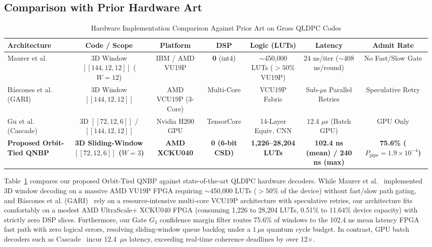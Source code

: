 \documentclass[journal]{IEEEtran}
\begin{document}
\subsection{Comparison with Prior Hardware Art}
\begin{table}[t]
\caption{Hardware Implementation Comparison Against Prior Art on Gross QLDPC Codes}
\label{tab:prior_art}
\centering
\begin{tabular}{lcccccc}
\toprule
\textbf{Architecture} & \textbf{Code / Scope} & \textbf{Platform} & \textbf{DSP} & \textbf{Logic (LUTs)} & \textbf{Latency} & \textbf{Admit Rate} \\
\midrule
Maurer et al.~\cite{maurer2025fpga} & 3D Window $[[144,12,12]]$ ($W=12$) & IBM / AMD VU19P & \textbf{0} (int4) & $\sim$450,000 LUTs ($>50\%$ VU19P) & 24 ns/iter ($\sim$408 ns/round) & No Fast/Slow Gate \\
B{\'a}scones et al. (GARI)~\cite{cowtan2024modular} & 3D Window $[[144,12,12]]$ & AMD VCU19P (3-Core) & Multi-Core & VCU19P Fabric & Sub-$\mu$s Parallel Retries & Speculative Retry \\
Gu et al. (Cascade)~\cite{gu2026cascade} & 3D $[[72,12,6]]$ / $[[144,12,12]]$ & Nvidia H200 GPU & TensorCore & 14-Layer Equiv. CNN & 12.4 $\mu$s (Batch GPU) & GPU Only \\
\midrule
\textbf{Proposed Orbit-Tied QNBP} & \textbf{3D Sliding-Window $[[72,12,6]]$ ($W=3$)} & \textbf{AMD XCKU040} & \textbf{0 (6-bit CSD)} & \textbf{1,226--28,204 LUTs} & \textbf{102.4 ns (mean) / 240 ns (max)} & \textbf{75.6\% ($P_{\text{pipe}} = 1.9\times 10^{-4}$)} \\
\bottomrule
\end{tabular}
\end{table}

Table~\ref{tab:prior_art} compares our proposed Orbit-Tied QNBP against state-of-the-art QLDPC hardware decoders. While Maurer et al.~\cite{maurer2025fpga} implemented 3D window decoding on a massive AMD VU19P FPGA requiring $\sim$450,000 LUTs ($>50\%$ of the device) without fast/slow path gating, and B{\'a}scones et al. (GARI)~\cite{cowtan2024modular} rely on a resource-intensive multi-core VCU19P architecture with speculative retries, our architecture fits comfortably on a modest AMD UltraScale+ XCKU040 FPGA (consuming 1,226 to 28,204 LUTs, 0.51\% to 11.64\% device capacity) with strictly zero DSP slices. Furthermore, our Gate $G_3$ confidence margin filter routes 75.6\% of windows to the 102.4 ns mean latency FPGA fast path with zero logical errors, resolving sliding-window queue backlog under a $1\,\mu\text{s}$ quantum cycle budget. In contrast, GPU batch decoders such as Cascade~\cite{gu2026cascade} incur 12.4~$\mu\text{s}$ latency, exceeding real-time coherence deadlines by over 12$\times$.
\end{document}
